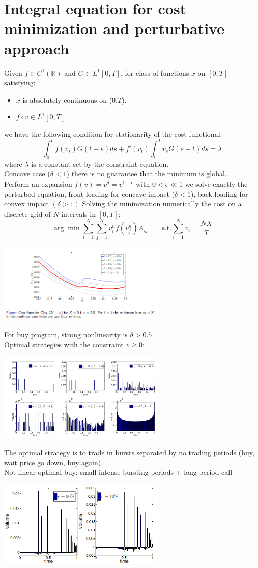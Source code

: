 \section{Integral equation for cost minimization and perturbative approach}
Given $f \in C^1 (\mathbb{R})$ and $G \in L^1 [0,T]$, for class of functions $x$ on $[0,T]$ satisfying:
\begin{itemize}
	\item $x$ is absolutely  continuous on (0,$T$).
	\item $f\circ v \in L^1 [0,T]$
\end{itemize}
we have the following condition for stationarity of the cost functional:
\[
\int_0^t f(v_s)G(t-s)ds + f'(v_t)\int_t^T v_s G(s-t)ds = \lambda
\]
where $\lambda$ is a constant set by the constraint equation.\\
Concave case ($\delta <1$) there is no guarantee that the minimum is global.\\
Perform an expansion $f(v) =v^\delta = v^{1 - \epsilon}$ with $0<\epsilon\ll 1$ we solve exactly the perturbed equation, front loading for concave impact ($\delta <1$), back loading for convex impact $(\delta >1)$
Solving the minimization numerically the cost on a discrete grid of $N$ intervals in $[0,T]$:
\[
\arg \min \sum_{i=1}^{N} \sum_{j=1}^{N} v_i^n f (v_j^n)A_{ij} \qquad \text{s.t.} \sum_{i=1}^{N} v_i = \frac{NX}{T}
\]
\begin{center}
	\includegraphics[width=0.6\textwidth]{picture/(20)perturbative_solution.png}
\end{center}
For buy program, strong nonlinearity is $\delta > 0.5$\\
Optimal strategies with the constraint $v\geq 0$:
\begin{center}
	\includegraphics[width=0.6\textwidth]{picture/(21)perturbative_solution_constraint.png}
\end{center}
The optimal strategy is to trade in bursts separated by no trading periods (buy, wait price go down, buy again).\\
Not linear optimal buy: small intense bursting periods + long period call
\begin{center}
	\includegraphics[width=0.6\textwidth]{picture/(22)spread_regularization.png}
\end{center}